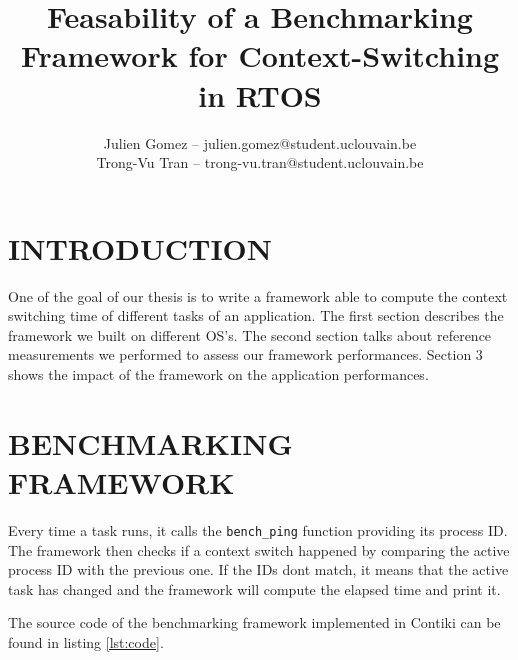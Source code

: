 \documentclass[a4paper, 10pt, conference]{ieeeconf}      %
\title{\LARGE \bf
Feasability of a Benchmarking Framework for Context-Switching in RTOS
}
\author{Julien Gomez -- julien.gomez@student.uclouvain.be
\\ Trong-Vu Tran -- trong-vu.tran@student.uclouvain.be}
\begin{document}
\maketitle
\thispagestyle{empty}
\pagestyle{empty}




\section*{INTRODUCTION}
One of the goal of our thesis is to write a framework able to compute the context switching time of different tasks of an application.
The first section describes the framework we built on different OS's.
The second section talks about reference measurements we performed to assess our framework performances.
Section 3 shows the impact of the framework on the application performances.

\section{BENCHMARKING FRAMEWORK}

Every time a task runs, it calls the \texttt{bench\_ping} function providing its process ID.
The framework then checks if a context switch happened by comparing the active process ID with the previous one.
If the IDs dont match, it means that the active task has changed and the framework will compute the elapsed time and print it.

The source code of the benchmarking framework implemented in Contiki can be found in listing \ref{lst:code}.
\end{document}
